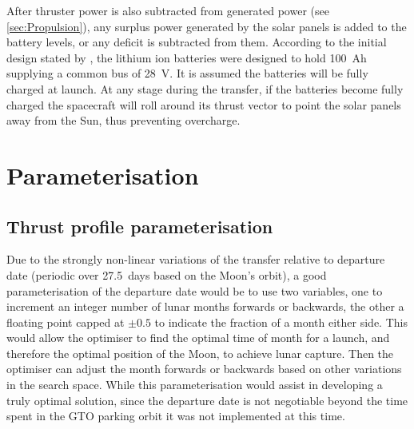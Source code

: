 After thruster power is also subtracted from generated power (see \autoref{sec:Propulsion}), any surplus power generated by the solar panels is added to the battery levels, or any deficit is subtracted from them. According to the initial design stated by \textcite{Falke2004}, the lithium ion batteries were designed to hold 100~Ah supplying a common bus of 28~V. It is assumed the batteries will be fully charged at launch. At any stage during the transfer, if the batteries become fully charged the spacecraft will roll around its thrust vector to point the solar panels away from the Sun, thus preventing overcharge.



\section{Parameterisation} \label{sec:Parameterisation}




\subsection{Thrust profile parameterisation} \label{sub:Thrust-parameterisation}

Due to the strongly non-linear variations of the transfer relative to departure date (periodic over 27.5~days based on the Moon's orbit), a good parameterisation of the departure date would be to use two variables, one to increment an integer number of lunar months forwards or backwards, the other a floating point capped at $\pm 0.5$ to indicate the fraction of a month either side. This would allow the optimiser to find the optimal time of month for a launch, and therefore the optimal position of the Moon, to achieve lunar capture. Then the optimiser can adjust the month forwards or backwards based on other variations in the search space. While this parameterisation would assist in developing a truly optimal solution, since the departure date is not negotiable beyond the time spent in the GTO parking orbit it was not implemented at this time.

